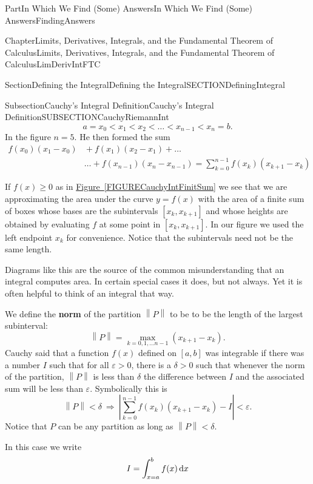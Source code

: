 \documentclass[oneside,10pt,]{book}
\newcommand{\xreffont}{\relax}
\newcommand{\terminology}[1]{\textbf{#1}}
\numberwithin{equation}{part}
\newcommand{\norm}[1]{\left\|#1\right\|}
\newcommand{\imp}{\ \Rightarrow\ }
\newcommand{\dx}[1]{\,{\rm d}#1}
\newcommand{\abs}[1]{\left|#1\right|}
\newcommand{\eps}{\varepsilon}
\newcommand{\lt}{<}
\newcommand{\amp}{&}
\begin{document}
\begin{partptx}{Part}{In Which We Find (Some) Answers}{}{In Which We Find (Some) Answers}{}{}{FindingAnswers}
\begin{chapterptx}{Chapter}{Limits, Derivatives, Integrals, and the Fundamental Theorem of Calculus}{}{Limits, Derivatives, Integrals, and the Fundamental Theorem of Calculus}{}{}{LimDerivIntFTC}
\begin{sectionptx}{Section}{Defining the Integral}{}{Defining the Integral}{}{}{SECTIONDefiningIntegral}
\begin{subsectionptx}{Subsection}{Cauchy's Integral Definition}{}{Cauchy's Integral Definition}{}{}{SUBSECTIONCauchyRiemannInt}
\begin{equation*}
a=x_0\lt x_1\lt x_2\lt\dots \lt x_{n-1}\lt x_n=b \text{.}
\end{equation*}
In the figure \(n=5\). He then formed the sum%
\begin{align*}
f\left(x_0\right)\left(x_1-x_0\right)\amp{}+f\left(x_1\right)\left(x_2-x_1\right)+\dots\\
\amp{}\dots
+f\left(x_{n-1}\right)\left(x_n-x_{n-1}\right)=\sum^{n-1}_{k=0}{f(x_k)(x_{k+1}-x_k)}
\end{align*}
%
\par
If \(f\left(x\right)\ge 0\) as in \hyperref[FIGURECauchyIntFinitSum]{Figure~{\xreffont\ref{FIGURECauchyIntFinitSum}}} we see that we are approximating the area under the curve \(y=f(x)\) with the area of a finite sum of boxes whose bases are the subintervals \([x_k,x_{k+1}]\) and whose heights are obtained by evaluating \(f\) at some point in \([x_k,x_{k+1}]\). In our figure we used the left endpoint \(x_k\) for convenience.       Notice that the subintervals need not be the same length.%
\par
Diagrams like this are the source of the common misunderstanding that an integral computes area. In certain special cases it does, but not always. Yet it is often helpful to think of an integral that way.%
\par
We define the \terminology{norm} of the partition \(\norm{P}\) to be to be the length of the largest subinterval:%
\begin{equation*}
\norm{P}=\max_{k=0, 1, \dots    n-1}(x_{k+1}-x_k) \text{.}
\end{equation*}
Cauchy said that a function \(f(x)\) defined on \([a,b]\) was integrable if there was a number \(I\) such that for all \(\eps >0\), there is a \(\delta >0\) such that whenever the norm of the partition, \(\norm{P}\) is less than \(\delta{}\) the difference between \(I\) and the  associated sum will be less than \(\eps{}\). Symbolically this is%
\begin{equation*}
\norm{P}\lt \delta \imp \abs{\sum^{n-1}_{k=0}{f\left(x_k\right)\left(x_{k+1}-x_k\right)}-I}\lt
\eps \text{.}
\end{equation*}
Notice that \(P\) can be any partition as long as \(\norm{P}\lt\delta \).%
\par
In this case we write%
\begin{equation*}
I=\int^b_{x=a}{f(x)\dx{x}}
\end{equation*}
%
\par

\end{subsectionptx}
\end{sectionptx}
\end{chapterptx}
\end{partptx}
\end{document}
